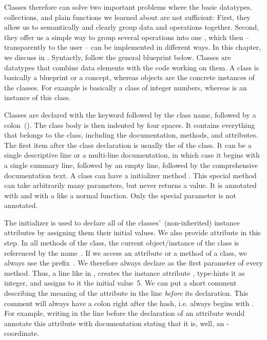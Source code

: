 Classes therefore can solve two important problems where the basic datatypes, collections, and plain functions we learned about are not sufficient:
First, they allow us to semantically and clearly group data and operations together.
Second, they offer us a simple way to group several operations into one , which then -- transparently to the user -- can be implemented in different ways.
In this chapter, we discuss  in \python.
Syntactly,  follow the general blueprint below.%
%
%
\FloatBarrier%
%
Classes are datatypes that combine data elements with the code working on them.
A class is basically a blueprint or a concept, whereas objects are the concrete instances of the classes.
For example  is basically a class of integer numbers, whereas  is an instance of this class.

Classes are declared with the keyword  followed by the class name, followed by a colon~(\inQuotes{:}).
The class body is then indented by four spaces.
It contains everything that belongs to the class, including the documentation, methods, and attributes.
The first item after the class declaration is usually the  of the class.
It can be a single descriptive line or a multi-line documentation, in which case it begins with a single summary line, followed by an empty line, followed by the comprehensive documentation text.
%
%
%
A class can have a initializer method .
This special method can take arbitrarily many parameters, but never returns a value.
It is annotated with  and with a  like a normal function.
Only the special parameter  is not annotated.

The initializer  is used to declare all of the classes'~(non-inherited) instance attributes by assigning them their initial values.
We also provide attribute  in this step.
In all methods of the class, the current object/instance of the class is referenced by the name~.
If we access an attribute or a method of a class, we always use the prefix~.
We therefore always declare  as the first parameter of every method.
Thus, a line like  in , creates the instance attribute , type-hints it as integer, and assigns to it the initial value~5.
We can put a short comment describing the meaning of the attribute in the line \emph{before} its declaration.
This comment will always have a colon right after the hash, i.e. always begins with \pythonil{\#: }\cite{SD2024SIDFD:DCAD}.
For example, writing  in the line before the declaration of an attribute  would annotate this attribute with documentation stating that it is, well, an -coordinate.

